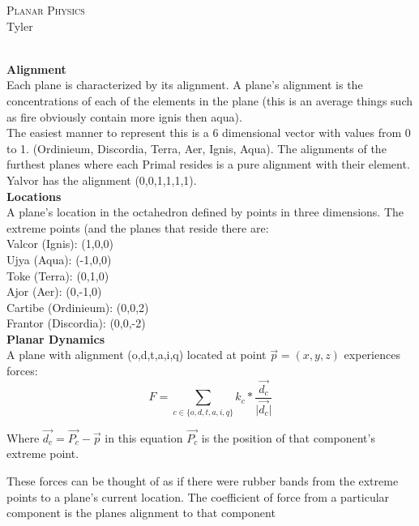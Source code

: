 \documentclass[10pt]{article}
\newcommand{\ruler}{\noindent\hrulefill\\}
\begin{document}
\begin{center}
\textsc{\Large{Planar Physics}}\\
Tyler
\end{center}
\ruler
\textbf{Alignment}\\
Each plane is characterized by its alignment. A plane's alignment is the concentrations of each of the elements in the plane (this is an average things such as fire obviously contain more ignis then aqua).\\

The easiest manner to represent this is a 6 dimensional vector with values from 0 to 1. (Ordinieum, Discordia, Terra, Aer, Ignis, Aqua). The alignments of the furthest planes where each Primal resides is a pure alignment with their element. Yalvor has the alignment (0,0,1,1,1,1).\\


\noindent\textbf{Locations}\\
A plane's location in the octahedron defined by points in three dimensions. The extreme points (and the planes that reside there are:\\

\noindent Valcor (Ignis): (1,0,0)\\
Ujya (Aqua): (-1,0,0)\\
Toke (Terra): (0,1,0)\\
Ajor (Aer):  (0,-1,0)\\
Cartibe (Ordinieum): (0,0,2)\\
Frantor (Discordia): (0,0,-2)\\


\noindent\textbf{Planar Dynamics}\\
A plane with alignment (o,d,t,a,i,q) located at point $\overrightarrow{p} = (x,y,z)$ experiences forces:\\
\begin{equation}
F = \sum_{c\in \{o,d,t,a,i,q\}} k_c*\frac{\overrightarrow{d_c}}{\vert\overrightarrow{d_c}\vert}
\end{equation}

Where $\overrightarrow{d_c}=\overrightarrow{P_c}-\overrightarrow{p}$ in this equation $\overrightarrow{P_c}$ is the position of that component's extreme point.

These forces can be thought of as if there were rubber bands from the extreme points to a plane's current location. The coefficient of force from a particular component is the planes alignment to that component\\
\end{document}
